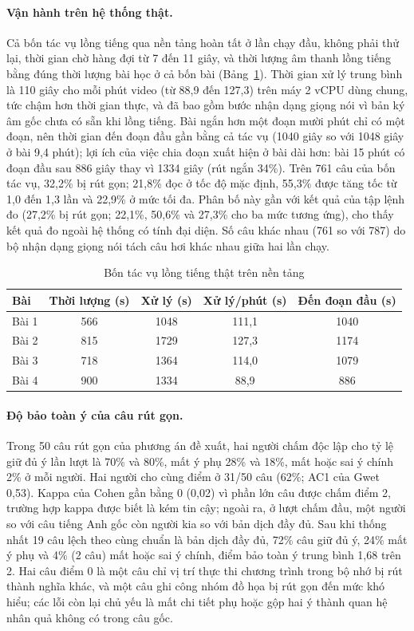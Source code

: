 \documentclass{IEEEtran}
\begin{document}
\paragraph{Vận hành trên hệ thống thật.} Cả bốn tác vụ lồng tiếng qua nền tảng hoàn tất ở lần chạy đầu, không phải thử lại, thời gian chờ hàng đợi từ 7 đến 11 giây, và thời lượng âm thanh lồng tiếng bằng đúng thời lượng bài học ở cả bốn bài (Bảng~\ref{tab:server}). Thời gian xử lý trung bình là 110 giây cho mỗi phút video (từ 88,9 đến 127,3) trên máy 2 vCPU dùng chung, tức chậm hơn thời gian thực, và đã bao gồm bước nhận dạng giọng nói vì bản ký âm gốc chưa có sẵn khi lồng tiếng. Bài ngắn hơn một đoạn mười phút chỉ có một đoạn, nên thời gian đến đoạn đầu gần bằng cả tác vụ (1040 giây so với 1048 giây ở bài 9,4 phút); lợi ích của việc chia đoạn xuất hiện ở bài dài hơn: bài 15 phút có đoạn đầu sau 886 giây thay vì 1334 giây (rút ngắn 34\%). Trên 761 câu của bốn tác vụ, 32,2\% bị rút gọn; 21,8\% đọc ở tốc độ mặc định, 55,3\% được tăng tốc từ 1,0 đến 1,3 lần và 22,9\% ở mức tối đa. Phân bố này gần với kết quả của tập lệnh đo (27,2\% bị rút gọn; 22,1\%, 50,6\% và 27,3\% cho ba mức tương ứng), cho thấy kết quả đo ngoài hệ thống có tính đại diện. Số câu khác nhau (761 so với 787) do bộ nhận dạng giọng nói tách câu hơi khác nhau giữa hai lần chạy.

\begin{table}[t]
\caption{Bốn tác vụ lồng tiếng thật trên nền tảng}
\label{tab:server}
\centering
\setlength{\tabcolsep}{3pt}
\begin{tabular}{|l|c|c|c|c|}
\hline
\textbf{Bài} & \textbf{Thời lượng (s)} & \textbf{Xử lý (s)} & \textbf{Xử lý/phút (s)} & \textbf{Đến đoạn đầu (s)} \\
\hline
Bài 1 & 566 & 1048 & 111,1 & 1040 \\
Bài 2 & 815 & 1729 & 127,3 & 1174 \\
Bài 3 & 718 & 1364 & 114,0 & 1079 \\
Bài 4 & 900 & 1334 & 88,9 & 886 \\
\hline
\end{tabular}
\end{table}

\paragraph{Độ bảo toàn ý của câu rút gọn.} Trong 50 câu rút gọn của phương án đề xuất, hai người chấm độc lập cho tỷ lệ giữ đủ ý lần lượt là 70\% và 80\%, mất ý phụ 28\% và 18\%, mất hoặc sai ý chính 2\% ở mỗi người. Hai người cho cùng điểm ở 31/50 câu (62\%; AC1 của Gwet 0,53). Kappa của Cohen gần bằng 0 (0,02) vì phần lớn câu được chấm điểm 2, trường hợp kappa được biết là kém tin cậy; ngoài ra, ở lượt chấm đầu, một người so với câu tiếng Anh gốc còn người kia so với bản dịch đầy đủ. Sau khi thống nhất 19 câu lệch theo cùng chuẩn là bản dịch đầy đủ, 72\% câu giữ đủ ý, 24\% mất ý phụ và 4\% (2 câu) mất hoặc sai ý chính, điểm bảo toàn ý trung bình 1,68 trên 2. Hai câu điểm 0 là một câu chỉ vị trí thực thi chương trình trong bộ nhớ bị rút thành nghĩa khác, và một câu ghi công nhóm đồ họa bị rút gọn đến mức khó hiểu; các lỗi còn lại chủ yếu là mất chi tiết phụ hoặc gộp hai ý thành quan hệ nhân quả không có trong câu gốc.
\end{document}
